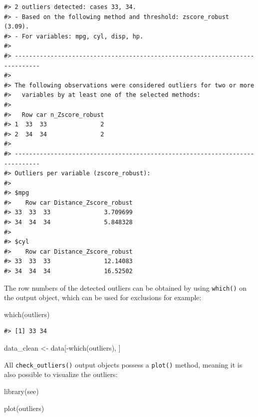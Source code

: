 \documentclass[mathematics,article,submit,moreauthors,pdftex]{mdpi}
\newenvironment{Shaded}{\begin{snugshade}}{\end{snugshade}}
\newcommand{\FunctionTok}[1]{\textcolor[rgb]{0.00,0.00,0.00}{#1}}
\newcommand{\NormalTok}[1]{#1}
\newcommand{\OtherTok}[1]{\textcolor[rgb]{0.56,0.35,0.01}{#1}}
\newcommand{\SpecialCharTok}[1]{\textcolor[rgb]{0.00,0.00,0.00}{#1}}
\begin{document}
\begin{verbatim}
#> 2 outliers detected: cases 33, 34.
#> - Based on the following method and threshold: zscore_robust (3.09).
#> - For variables: mpg, cyl, disp, hp.
#> 
#> -----------------------------------------------------------------------------
#>  
#> The following observations were considered outliers for two or more
#>   variables by at least one of the selected methods:
#> 
#>   Row car n_Zscore_robust
#> 1  33  33               2
#> 2  34  34               2
#> 
#> -----------------------------------------------------------------------------
#> Outliers per variable (zscore_robust): 
#> 
#> $mpg
#>    Row car Distance_Zscore_robust
#> 33  33  33               3.709699
#> 34  34  34               5.848328
#> 
#> $cyl
#>    Row car Distance_Zscore_robust
#> 33  33  33               12.14083
#> 34  34  34               16.52502
\end{verbatim}

The row numbers of the detected outliers can be obtained by using
\texttt{which()} on the output object, which can be used for exclusions
for example:

\begin{Shaded}
\begin{Highlighting}[]
\FunctionTok{which}\NormalTok{(outliers)}
\end{Highlighting}
\end{Shaded}

\begin{verbatim}
#> [1] 33 34
\end{verbatim}

\begin{Shaded}
\begin{Highlighting}[]
\NormalTok{data\_clean }\OtherTok{\textless{}{-}}\NormalTok{ data[}\SpecialCharTok{{-}}\FunctionTok{which}\NormalTok{(outliers), ]}
\end{Highlighting}
\end{Shaded}

All \texttt{check\_outliers()} output objects possess a \texttt{plot()}
method, meaning it is also possible to visualize the outliers:

\begin{Shaded}
\begin{Highlighting}[]
\FunctionTok{library}\NormalTok{(see)}

\FunctionTok{plot}\NormalTok{(outliers)}
\end{Highlighting}
\end{Shaded}
\end{document}
